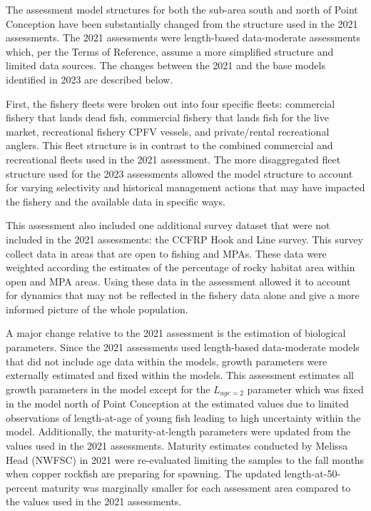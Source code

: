 \documentclass[11pt,
  letterpaper,
]{article}
\begin{document}
The assessment model structures for both the sub-area south and north of Point Conception have been substantially changed from the structure used in the 2021 assessments. The 2021 assessments were length-based data-moderate assessments which, per the Terms of Reference, assume a more simplified structure and limited data sources. The changes between the 2021 and the base models identified in 2023 are described below.

First, the fishery fleets were broken out into four specific fleets: commercial fishery that lands dead fish, commercial fishery that lands fish for the live market, recreational fishery CPFV vessels, and private/rental recreational anglers. This fleet structure is in contrast to the combined commercial and recreational fleets used in the 2021 assessment. The more disaggregated fleet structure used for the 2023 assessments allowed the model structure to account for varying selectivity and historical management actions that may have impacted the fishery and the available data in specific ways.

This assessment also included one additional survey dataset that were not included in the 2021 assessments: the CCFRP Hook and Line survey. This survey collect data in areas that are open to fishing and MPAs. These data were weighted according the estimates of the percentage of rocky habitat area within open and MPA areas. Using these data in the assessment allowed it to account for dynamics that may not be reflected in the fishery data alone and give a more informed picture of the whole population.

A major change relative to the 2021 assessment is the estimation of biological parameters. Since the 2021 assessments used length-based data-moderate models that did not include age data within the models, growth parameters were externally estimated and fixed within the models. This assessment estimates all growth parameters in the model except for the \(L_{age=2}\) parameter which was fixed in the model north of Point Conception at the estimated values due to limited observations of length-at-age of young fish leading to high uncertainty within the model. Additionally, the maturity-at-length parameters were updated from the values used in the 2021 assessments. Maturity estimates conducted by Melissa Head (NWFSC) in 2021 were re-evaluated limiting the samples to the fall months when copper rockfish are preparing for spawning. The updated length-at-50-percent maturity was marginally smaller for each assessment area compared to the values used in the 2021 assessments.
\end{document}
